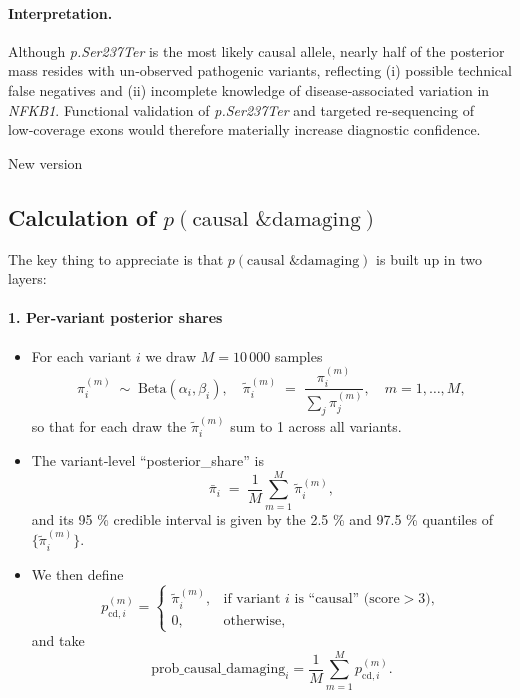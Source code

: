 \paragraph{Interpretation.}
Although \textit{p.Ser237Ter} is the most likely causal allele, nearly half of the
posterior mass resides with un‑observed pathogenic variants, reflecting (i)
possible technical false negatives and (ii) incomplete knowledge of
disease‑associated variation in \textit{NFKB1}.  Functional validation of
\textit{p.Ser237Ter} and targeted re‑sequencing of low‑coverage exons would
therefore materially increase diagnostic confidence.











New version

\subsection*{Calculation of \(p(\text{causal \& damaging})\)}

The key thing to appreciate is that \(p(\text{causal \& damaging})\) is built up in two layers:

\paragraph{1. Per‑variant posterior shares}
\begin{itemize}
  \item For each variant \(i\) we draw \(M=10\,000\) samples
    \[
      \pi_i^{(m)} \;\sim\;\mathrm{Beta}(\alpha_i,\beta_i),
      \quad
      \tilde\pi_i^{(m)} \;=\;\frac{\pi_i^{(m)}}{\sum_j \pi_j^{(m)}},
      \quad m=1,\dots,M,
    \]
    so that for each draw the \(\tilde\pi_i^{(m)}\) sum to 1 across all variants.
  \item The variant‐level ``posterior\_share'' is
    \[
      \bar\pi_i \;=\;\frac{1}{M}\sum_{m=1}^M \tilde\pi_i^{(m)},
    \]
    and its 95 \% credible interval is given by the 2.5 \% and 97.5 \% quantiles of \(\{\tilde\pi_i^{(m)}\}\).
  \item We then define
    \[
      p_{\text{cd},i}^{(m)}
      =
      \begin{cases}
        \tilde\pi_i^{(m)}, & \text{if variant \(i\) is ``causal'' (score}>3),\\
        0,                  & \text{otherwise},
      \end{cases}
    \]
    and take
    \[
      \mathrm{prob\_causal\_damaging}_i
      = \frac{1}{M}\sum_{m=1}^M p_{\text{cd},i}^{(m)}.
    \]
\end{itemize}

